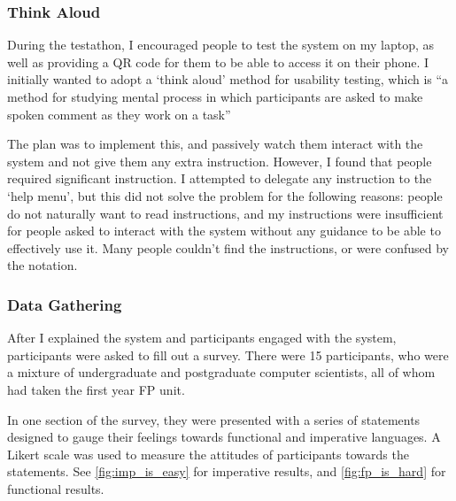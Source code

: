\subsubsection{Think Aloud}
During the testathon, I encouraged people to test the system on my laptop, as well as providing a QR code for them to be able to access it on their phone. I initially wanted to adopt a `think aloud' method for usability testing, which is ``a method for studying mental process in which participants are asked to make spoken comment as they work on a task''\cite{thinkaloud}

The plan was to implement this, and passively watch them interact with the system and not give them any extra instruction. However, I found that people required significant instruction. I attempted to delegate any instruction to the `help menu', but this did not solve the problem for the following reasons: people do not naturally want to read instructions, and my instructions were insufficient for people asked to interact with the system without any guidance to be able to effectively use it. Many people couldn't find the instructions, or were confused by the notation.

\subsubsection{Data Gathering}
After I explained the system and participants engaged with the system, participants were asked to fill out a survey. There were 15 participants, who were a mixture of undergraduate and postgraduate computer scientists, all of whom had taken the first year \ac{FP} unit. 

In one section of the survey, they were presented with a series of statements designed to gauge their feelings towards functional and imperative languages. A Likert scale\cite{likert1932technique} was used to measure the attitudes of participants towards the statements. See \ref{fig:imp_is_easy} for imperative results, and \ref{fig:fp_is_hard} for functional results. 

